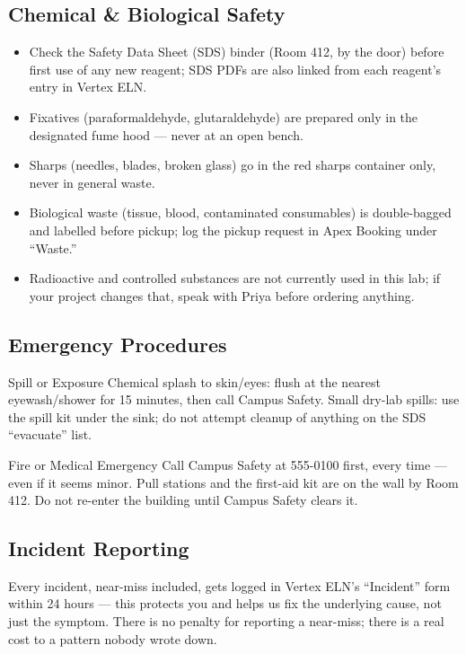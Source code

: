 \subsection*{Chemical \& Biological Safety}
\begin{itemize}[leftmargin=1.3em]
  \item Check the Safety Data Sheet (SDS) binder (Room 412, by the door) before first use of
        any new reagent; SDS PDFs are also linked from each reagent's entry in Vertex ELN.
  \item Fixatives (paraformaldehyde, glutaraldehyde) are prepared only in the designated fume
        hood --- never at an open bench.
  \item Sharps (needles, blades, broken glass) go in the red sharps container only, never in
        general waste.
  \item Biological waste (tissue, blood, contaminated consumables) is double-bagged and
        labelled before pickup; log the pickup request in Apex Booking under ``Waste.''
  \item Radioactive and controlled substances are not currently used in this lab; if your
        project changes that, speak with Priya before ordering anything.
\end{itemize}

\subsection*{Emergency Procedures}
\begin{minipage}[t]{0.485\textwidth}
\begin{safetybox}{Spill or Exposure}
Chemical splash to skin/eyes: flush at the nearest eyewash/shower for 15 minutes, then call
Campus Safety. Small dry-lab spills: use the spill kit under the sink; do not attempt
cleanup of anything on the SDS ``evacuate'' list.
\end{safetybox}
\end{minipage}\hfill%
\begin{minipage}[t]{0.485\textwidth}
\begin{safetybox}{Fire or Medical Emergency}
Call Campus Safety at 555-0100 first, every time --- even if it seems minor. Pull stations
and the first-aid kit are on the wall by Room 412. Do not re-enter the building until Campus
Safety clears it.
\end{safetybox}
\end{minipage}
\par

\subsection*{Incident Reporting}
Every incident, near-miss included, gets logged in Vertex ELN's ``Incident'' form within 24
hours --- this protects you and helps us fix the underlying cause, not just the symptom. There
is no penalty for reporting a near-miss; there is a real cost to a pattern nobody wrote down.
